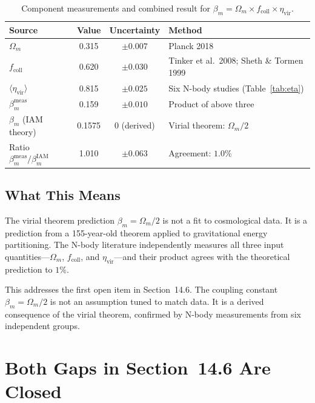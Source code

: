 \documentclass[12pt,a4paper]{article}
\begin{document}
\begin{table}[h]
\centering
\small
\caption{Component measurements and combined result for
$\beta_m = \Omega_m \times f_{\mathrm{coll}} \times \eta_{\mathrm{vir}}$.}
\label{tab:synthesis}
\begin{tabular}{lccp{6cm}}
\toprule
\textbf{Source} & \textbf{Value} & \textbf{Uncertainty} & \textbf{Method} \\
\midrule
$\Omega_m$ & 0.315 & $\pm 0.007$ &
  Planck 2018 \citep{Planck2018} \\
$f_{\mathrm{coll}}$ & 0.620 & $\pm 0.030$ &
  Tinker et al.\ 2008; Sheth \& Tormen 1999 \\
$\langle\eta_{\mathrm{vir}}\rangle$ & 0.815 & $\pm 0.025$ &
  Six N-body studies (Table~\ref{tab:eta}) \\
\midrule
$\beta_m^{\mathrm{meas}}$ & 0.159 & $\pm 0.010$ &
  Product of above three \\
$\beta_m$ (IAM theory) & 0.1575 & 0 (derived) &
  Virial theorem: $\Omega_m/2$ \\
\midrule
Ratio $\beta_m^{\mathrm{meas}}/\beta_m^{\mathrm{IAM}}$ &
  1.010 & $\pm 0.063$ & Agreement: $1.0\%$ \\
\bottomrule
\end{tabular}
\end{table}

\subsection{What This Means}
\label{sec:meaning}

The virial theorem prediction $\beta_m = \Omega_m/2$ is not a fit to
cosmological data. It is a prediction from a 155-year-old theorem applied
to gravitational energy partitioning. The N-body literature independently
measures all three input quantities---$\Omega_m$, $f_{\mathrm{coll}}$,
and $\eta_{\mathrm{vir}}$---and their product agrees with the theoretical
prediction to $1\%$.

This addresses the first open item in \citet{Mahaffey2026a} Section~14.6.
The coupling constant $\beta_m = \Omega_m/2$ is not an assumption tuned
to match data. It is a derived consequence of the virial theorem,
confirmed by N-body measurements from six independent groups.

\section{Both Gaps in Section~14.6 Are Closed}
\label{sec:gaps}
\end{document}
